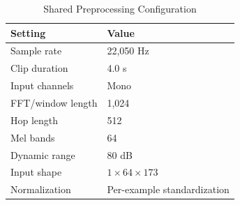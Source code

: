 \begin{table}[t]
  \caption{Shared Preprocessing Configuration}
  \label{tab:preprocessing}
  \centering
  \begin{tabular}{ll}
    \toprule
    Setting & Value \\
    \midrule
    Sample rate & 22,050 Hz \\
    Clip duration & 4.0 s \\
    Input channels & Mono \\
    FFT/window length & 1,024 \\
    Hop length & 512 \\
    Mel bands & 64 \\
    Dynamic range & 80 dB \\
    Input shape & $1 \times 64 \times 173$ \\
    Normalization & Per-example standardization \\
    \bottomrule
  \end{tabular}
\end{table}
